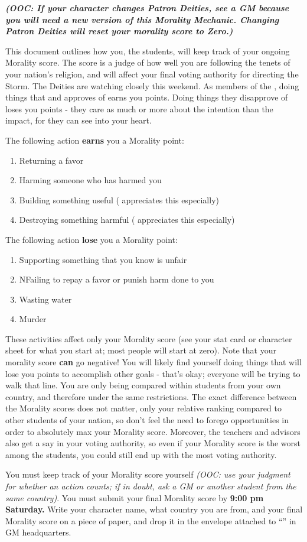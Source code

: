 \documentclass[green]{GL2020}
\begin{document}
\name{\gWRStudentMorality{}}
\emph{\textbf{(OOC: If your character changes Patron Deities, see a GM because you will need a new version of this Morality Mechanic. Changing Patron Deities will reset your morality score to Zero.)}}

This document outlines how you, the students, will keep track of your ongoing Morality score. The score is a judge of how well you are following the tenets of your nation’s religion, and will affect your final voting authority for directing the Storm. The Deities are watching closely this weekend. As members of the \pShip{}, doing things that \cEbbFull{\full} and \cFlowFull{\full} approves of earns you points. Doing things they disapprove of loses you points - they care as much or more about the intention than the impact, for they can see into your heart.

The following action \textbf{earns} you a Morality point:
\begin{enumerate}
  \item Returning a favor
  \item Harming someone who has harmed you
  \item Building something useful (\cFlow{} appreciates this especially)
  \item Destroying something harmful (\cEbb{} appreciates this especially)
\end{enumerate}

The following action \textbf{lose} you a Morality point:
\begin{enumerate}
  \item Supporting something that you know is unfair
  \item NFailing to repay a favor or punish harm done to you
  \item Wasting water
  \item Murder
\end{enumerate}

These activities affect only your Morality score (see your stat card or character sheet for what you start at; most people will start at zero).  Note that your morality score \textbf{can} go negative! You will likely find yourself doing things that will lose you points to accomplish other goals - that’s okay; everyone will be trying to walk that line. You are only being compared within students from your own country, and therefore under the same restrictions. The exact difference between the Morality scores does not matter, only your relative ranking compared to other students of your nation, so don’t feel the need to forego opportunities in order to absolutely max your Morality score. Moreover, the teachers and advisors also get a say in your voting authority, so even if your Morality score is the worst among the students, you could still end up with the most voting authority. 

You must keep track of your Morality score yourself \emph{(OOC: use your judgment for whether an action counts; if in doubt, ask a GM or another student from the same country)}. You must submit your final Morality score by \textbf{9:00 pm Saturday.} Write your character name, what country you are from, and your final Morality score on a piece of paper, and drop it in the envelope attached to “\sSignV{}” in GM headquarters. 
\end{document}
